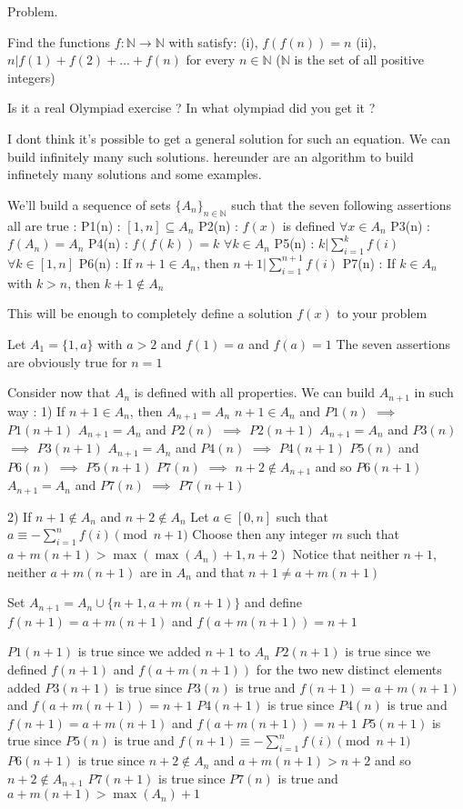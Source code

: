 \begin{solution}
	\begin{tcolorbox}\begin{bolded}Problem.\end{bolded} Find the functions $f:\mathbb{N}\rightarrow \mathbb{N}$ with satisfy:
(i), $f(f(n))=n$ 
(ii), $n|f(1)+f(2)+...+f(n)$
for every $n\in \mathbb{N}$ ($\mathbb{N}$ is the set of all positive integers)\end{tcolorbox}
Is it a real Olympiad exercise ?
In what olympiad did you get it ?

I dont think it's possible to get a general solution for such an equation.
We can build infinitely many such solutions. hereunder are an algorithm to build infinetely many solutions and some examples.

We'll build a sequence of sets $\{A_n\}_{n\in\mathbb N}$ such that the seven following assertions all are true :
P1(n) : $[1,n]\subseteq A_n$
P2(n) : $f(x)$ is defined $\forall x\in A_n$
P3(n) : $f(A_n)=A_n$
P4(n) : $f(f(k))=k$ $\forall k\in A_n$
P5(n) : $k|\sum_{i=1}^kf(i)$ $\forall k\in[1,n]$
P6(n) : If $n+1\in A_n$, then $n+1|\sum_{i=1}^{n+1}f(i)$
P7(n) : If $k\in A_n$ with $k>n$, then $k+1\notin A_n$

This will be enough to completely define a solution $f(x)$ to your problem


Let $A_1=\{1,a\}$ with $a>2$ and $f(1)=a$ and $f(a)=1$
The seven assertions are obviously true for $n=1$

Consider now that $A_n$ is defined with all properties. We can build $A_{n+1}$ in such way :
1) If $n+1\in A_n$, then $A_{n+1}=A_n$
$n+1\in A_n$ and $P1(n)$ $\implies$ $P1(n+1)$
$A_{n+1}=A_n$ and $P2(n)$ $\implies$ $P2(n+1)$
$A_{n+1}=A_n$ and $P3(n)$ $\implies$ $P3(n+1)$
$A_{n+1}=A_n$ and $P4(n)$ $\implies$ $P4(n+1)$
$P5(n)$ and $P6(n)$ $\implies$ $P5(n+1)$
$P7(n)$ $\implies$ $n+2\notin A_{n+1}$ and so $P6(n+1)$
$A_{n+1}=A_n$ and $P7(n)$ $\implies$ $P7(n+1)$

2) If $n+1\notin A_n$ and $n+2\notin A_n$
Let $a\in[0,n]$ such that $a\equiv -\sum_{i=1}^nf(i)\pmod{n+1}$
Choose then any integer $m$ such that $a+m(n+1)>\max(\max(A_n)+1,n+2)$
Notice that neither $n+1$, neither $a+m(n+1)$ are in $A_n$ and that $n+1\ne a+m(n+1)$ 

Set $A_{n+1}=A_n\cup\{n+1,a+m(n+1)\}$ and define $f(n+1)=a+m(n+1)$ and $f(a+m(n+1))=n+1$

$P1(n+1)$ is true since we added $n+1$ to $A_n$
$P2(n+1)$ is true since we defined $f(n+1)$ and $f(a+m(n+1))$ for the two new distinct elements added
$P3(n+1)$ is true since $P3(n)$ is true and $f(n+1)=a+m(n+1)$ and $f(a+m(n+1))=n+1$
$P4(n+1)$ is true since $P4(n)$ is true and $f(n+1)=a+m(n+1)$ and $f(a+m(n+1))=n+1$
$P5(n+1)$ is true since $P5(n)$ is true and $f(n+1)\equiv -\sum_{i=1}^nf(i)\pmod{n+1}$
$P6(n+1)$ is true since $n+2\notin A_n$ and $a+m(n+1)>n+2$ and so $n+2\notin A_{n+1}$
$P7(n+1)$ is true since $P7(n)$ is true and $a+m(n+1)>\max(A_n)+1$


\end{solution}

